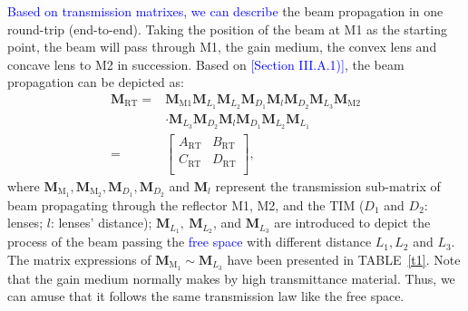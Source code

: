 \documentclass{IEEEtran}
\begin{document}
\textcolor{blue}{Based on transmission matrixes, we can describe} the beam propagation in one round-trip (end-to-end). Taking the position of the beam at M1 as the starting point, the beam will pass through M1, the gain medium, the convex lens and concave lens to M2 in succession. Based on \textcolor{blue}{[Section III.A.1)]}, the beam propagation can be depicted as:
\begin{equation}\label{transfer matrix1}
\begin{aligned}
\mathbf{M}_\mathrm{RT}
=&\mathbf{M}_\mathrm{M1}\mathbf{M}_{L_1}\mathbf{M}_{L_2}\mathbf{M}_{D_1}\mathbf{M}_l\mathbf{M}_{D_2}\mathbf{M}_{L_3}\mathbf{M}_\mathrm{M2}\\
&\cdot\mathbf{M}_{L_3}\mathbf{M}_{D_2}\mathbf{M}_l\mathbf{M}_{D_1}\mathbf{M}_{L_2}\mathbf{M}_{L_1}\\
= & \left[ \begin{array}{cc}A_\mathrm{RT} & B_\mathrm{RT} \\C_\mathrm{RT} & D_\mathrm{RT} \\\end{array} \right ],
\end{aligned}
\end{equation}
where $\mathbf{M}_\mathrm{M_1}, \mathbf{M}_\mathrm{M_2}, \mathbf{M}_{D_1}, \mathbf{M}_{D_2}$ and $\mathbf{M}_{l}$ represent the transmission sub-matrix of beam propagating through the reflector M1, M2, and the TIM ($D_1$ and $D_2$: lenses; $l$: lenses' distance); $\mathbf{M}_{L_1},~\mathbf{M}_{L_2}$, and $\mathbf{M}_{L_3}$ are introduced to depict the process of the beam passing the \textcolor{blue}{free space} with different distance $L_1, L_2$ and $L_3$. 
The matrix expressions of $\mathbf{M}_\mathrm{M_1} \sim \mathbf{M}_{L_3}$ have been presented in TABLE~\ref{t1}. 
Note that the gain medium normally makes by high transmittance material. Thus, we can amuse that it follows the same transmission law like the free space.
\end{document}

